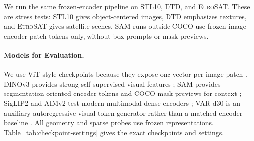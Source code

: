 \documentclass{article}
\newcommand{\dataset}[1]{\textsc{#1}}
\begin{document}
We run the same frozen-encoder pipeline on \dataset{STL10}, \dataset{DTD}, and \dataset{EuroSAT}. These are stress tests: \dataset{STL10} gives object-centered images, \dataset{DTD} emphasizes textures, and \dataset{EuroSAT} gives satellite scenes. SAM runs outside \dataset{COCO} use frozen image-encoder patch tokens only, without box prompts or mask previews.

\paragraph{Models for Evaluation.}
We use ViT-style checkpoints because they expose one vector per image patch \citep{dosovitskiy2021image}. DINOv3 provides strong self-supervised visual features \citep{simeoni2025dinov3}; SAM provides segmentation-oriented encoder tokens and COCO mask previews for context \citep{kirillov2023segment}; SigLIP2 and AIMv2 test modern multimodal dense encoders \citep{tschannen2025siglip2,elnouby2024aimv2}; VAR-d30 is an auxiliary autoregressive visual-token generator rather than a matched encoder baseline \citep{tian2024visual}. All geometry and sparse probes use frozen representations. Table~\ref{tab:checkpoint-settings} gives the exact checkpoints and settings.
\end{document}

